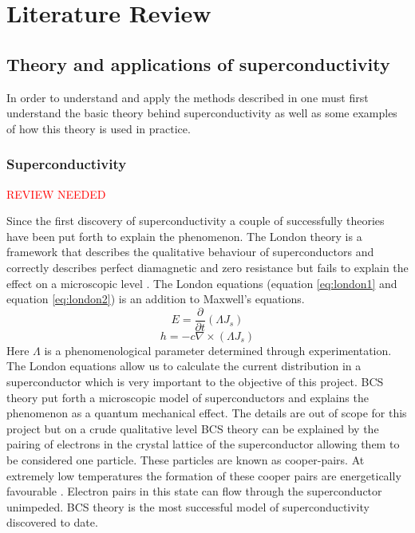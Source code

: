 \graphicspath{{litreview/fig/}}

\chapter{Literature Review}
\label{chap:litreview}


\section{Theory and applications of superconductivity}
In order to understand and apply the methods described in \cite{fluxNoiseSquidsStevenAnton} one must first understand the basic theory behind superconductivity as well as some examples of how this theory is used in practice.

\subsection{Superconductivity}
\textcolor{red}{REVIEW NEEDED}

Since the first discovery of superconductivity a couple of successfully theories have been put forth to explain the phenomenon. The London theory is a framework that describes the qualitative behaviour of superconductors and correctly describes perfect diamagnetic and zero resistance but fails to explain the effect on a microscopic level \cite{Golubov_1998}. The London equations (equation \ref{eq:london1} and equation \ref{eq:london2}) \cite{Tinkham_2015} is an addition to Maxwell's equations.
\begin{equation}
    E = \frac{\partial}{\partial t}(\Lambda J_s)
    \label{eq:london1}
\end{equation}
\begin{equation}
    h = -c \nabla\times (\Lambda J_s)
    \label{eq:london2}
\end{equation}
Here $\Lambda$ is a phenomenological parameter determined through experimentation. The London equations allow us to calculate the current distribution in a superconductor which is very important to the objective of this project. BCS theory put forth a microscopic model of superconductors and explains the phenomenon as a quantum mechanical effect. The details are out of scope for this project but on a crude qualitative level BCS theory can be explained by the pairing of electrons in the crystal lattice of the superconductor allowing them to be considered one particle. These particles are known as cooper-pairs. At extremely low temperatures the formation of these cooper pairs are energetically favourable \cite{Feynman_Leighton_Sands_2013}. Electron pairs in this state can flow through the superconductor unimpeded. BCS theory is the most successful model of superconductivity discovered to date. 

